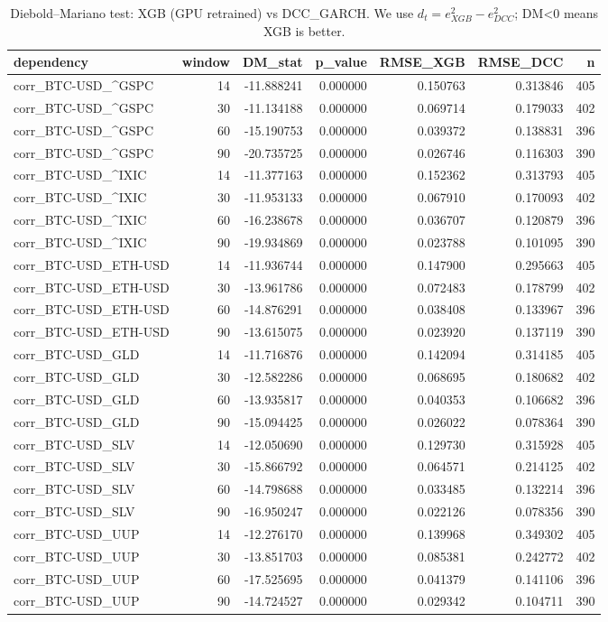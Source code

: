 \begin{table}
\caption{Diebold--Mariano test: XGB (GPU retrained) vs DCC\_GARCH. We use $d_t=e_{XGB}^2-e_{DCC}^2$; DM<0 means XGB is better.}
\label{tab:dm_xgb_vs_dcc}
\begin{tabular}{lrrrrrr}
\toprule
dependency & window & DM_stat & p_value & RMSE_XGB & RMSE_DCC & n \\
\midrule
corr_BTC-USD_^GSPC & 14 & -11.888241 & 0.000000 & 0.150763 & 0.313846 & 405 \\
corr_BTC-USD_^GSPC & 30 & -11.134188 & 0.000000 & 0.069714 & 0.179033 & 402 \\
corr_BTC-USD_^GSPC & 60 & -15.190753 & 0.000000 & 0.039372 & 0.138831 & 396 \\
corr_BTC-USD_^GSPC & 90 & -20.735725 & 0.000000 & 0.026746 & 0.116303 & 390 \\
corr_BTC-USD_^IXIC & 14 & -11.377163 & 0.000000 & 0.152362 & 0.313793 & 405 \\
corr_BTC-USD_^IXIC & 30 & -11.953133 & 0.000000 & 0.067910 & 0.170093 & 402 \\
corr_BTC-USD_^IXIC & 60 & -16.238678 & 0.000000 & 0.036707 & 0.120879 & 396 \\
corr_BTC-USD_^IXIC & 90 & -19.934869 & 0.000000 & 0.023788 & 0.101095 & 390 \\
corr_BTC-USD_ETH-USD & 14 & -11.936744 & 0.000000 & 0.147900 & 0.295663 & 405 \\
corr_BTC-USD_ETH-USD & 30 & -13.961786 & 0.000000 & 0.072483 & 0.178799 & 402 \\
corr_BTC-USD_ETH-USD & 60 & -14.876291 & 0.000000 & 0.038408 & 0.133967 & 396 \\
corr_BTC-USD_ETH-USD & 90 & -13.615075 & 0.000000 & 0.023920 & 0.137119 & 390 \\
corr_BTC-USD_GLD & 14 & -11.716876 & 0.000000 & 0.142094 & 0.314185 & 405 \\
corr_BTC-USD_GLD & 30 & -12.582286 & 0.000000 & 0.068695 & 0.180682 & 402 \\
corr_BTC-USD_GLD & 60 & -13.935817 & 0.000000 & 0.040353 & 0.106682 & 396 \\
corr_BTC-USD_GLD & 90 & -15.094425 & 0.000000 & 0.026022 & 0.078364 & 390 \\
corr_BTC-USD_SLV & 14 & -12.050690 & 0.000000 & 0.129730 & 0.315928 & 405 \\
corr_BTC-USD_SLV & 30 & -15.866792 & 0.000000 & 0.064571 & 0.214125 & 402 \\
corr_BTC-USD_SLV & 60 & -14.798688 & 0.000000 & 0.033485 & 0.132214 & 396 \\
corr_BTC-USD_SLV & 90 & -16.950247 & 0.000000 & 0.022126 & 0.078356 & 390 \\
corr_BTC-USD_UUP & 14 & -12.276170 & 0.000000 & 0.139968 & 0.349302 & 405 \\
corr_BTC-USD_UUP & 30 & -13.851703 & 0.000000 & 0.085381 & 0.242772 & 402 \\
corr_BTC-USD_UUP & 60 & -17.525695 & 0.000000 & 0.041379 & 0.141106 & 396 \\
corr_BTC-USD_UUP & 90 & -14.724527 & 0.000000 & 0.029342 & 0.104711 & 390 \\
\bottomrule
\end{tabular}
\end{table}
